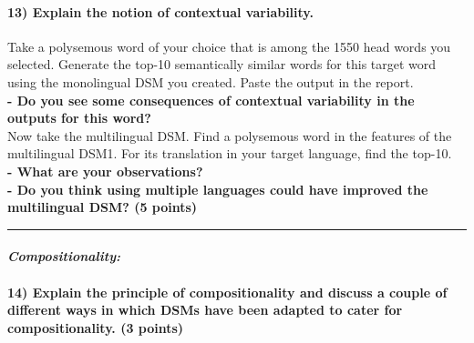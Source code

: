 \documentclass[11pt]{article}
\begin{document}
    \hypertarget{explain-the-notion-of-contextual-variability.}{%
\paragraph{13) Explain the notion of contextual
variability.}\label{explain-the-notion-of-contextual-variability.}}

Take a polysemous word of your choice that is among the 1550 head words
you selected. Generate the top-10 semantically similar words for this
target word using the monolingual DSM you created. Paste the output in
the report.\\
\textbf{- Do you see some consequences of contextual variability in the
outputs for this word?}\\
Now take the multilingual DSM. Find a polysemous word in the features of
the multilingual DSM1. For its translation in your target language, find
the top-10.\\
\textbf{- What are your observations?}\\
\textbf{- Do you think using multiple languages could have improved the
multilingual DSM? (5 points)}

    \begin{center}\rule{0.5\linewidth}{\linethickness}\end{center}

\hypertarget{compositionality}{%
\paragraph{\texorpdfstring{\emph{Compositionality:}}{Compositionality:}}\label{compositionality}}

    \hypertarget{explain-the-principle-of-compositionality-and-discuss-a-couple-of-different-ways-in-which-dsms-have-been-adapted-to-cater-for-compositionality.-3-points}{%
\paragraph{14) Explain the principle of compositionality and discuss a
couple of different ways in which DSMs have been adapted to cater for
compositionality. (3
points)}\label{explain-the-principle-of-compositionality-and-discuss-a-couple-of-different-ways-in-which-dsms-have-been-adapted-to-cater-for-compositionality.-3-points}}
\end{document}
